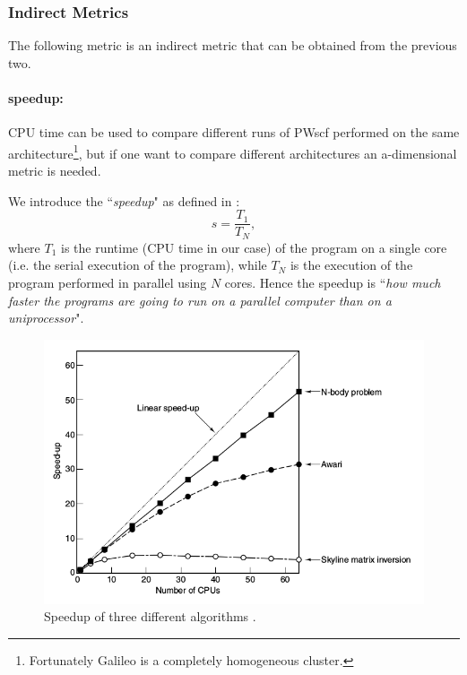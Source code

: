 \documentclass[a4paper,12pt]{article}
\begin{document}
\subsubsection{Indirect Metrics}

The following metric is an indirect metric that can be obtained from the previous two.

\paragraph{speedup:}  CPU time can be used to compare different runs of PWscf performed on the same architecture\footnote{Fortunately Galileo is a completely homogeneous cluster.}, but if one want to compare different architectures an a-dimensional metric is needed.

We introduce the ``\textit{speedup}" as defined in \cite{Tanenbaum} : 
\begin{equation}\label{eq:speedup}
	s = \frac{T_{1}}{T_{N}},
\end{equation}
where $T_{1}$ is the runtime (CPU time in our case) of the program on a single core (i.e. the serial execution of the program), while $T_{N}$ is the execution of the program performed in parallel using $N$ cores.
Hence the speedup is ``\textit{how much faster the programs are going to run on a parallel computer than on a
uniprocessor}"\cite[p.648]{Tanenbaum}.

\begin{figure}[hhh!]
\begin{center}
	\includegraphics[scale=0.5]{tanenbaum_speedup.png}	
	\caption{Speedup of three different algorithms \cite{Tanenbaum}.}
	\label{fig:TanenbaumSpeedup}
\end{center}
\end{figure}
\end{document}
